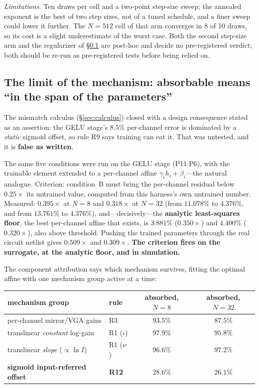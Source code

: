 \documentclass[11pt]{article}
\begin{document}
\textit{Limitations.} Ten draws per cell and a two-point step-size sweep; the annealed exponent is the best of two step sizes, not of a tuned schedule, and a finer sweep could lower it further. The $N=512$ cell of that arm converges in 8 of 10 draws, so its cost is a slight underestimate of the worst case. Both the second step-size arm and the regularizer of \S\ref{sec:gelulimit} are post-hoc and decide no pre-registered verdict; both should be re-run as pre-registered tests before being relied on.

\subsection{The limit of the mechanism: absorbable means ``in the span of the parameters''}
\label{sec:gelulimit}

The mismatch calculus (\S\ref{sec:calculus}) closed with a design consequence stated as an assertion: the GELU stage's $8.5\%$ per-channel error is dominated by a \textit{static} sigmoid offset, so rule R9 says training can eat it. That was untested, and it is \textbf{false as written}.

The same five conditions were run on the GELU stage (P11$\cdot$P6), with the trainable element extended to a per-channel affine $\gamma_i h_i + \beta_i$---the natural analogue. Criterion: condition~B must bring the per-channel residual below $0.25\times$ its untrained value, computed from this harness's own untrained number. Measured: $\mathbf{0.395\times}$ at $N=8$ and $\mathbf{0.318\times}$ at $N=32$ (from $11.078\%$ to $4.376\%$, and from $13.761\%$ to $4.376\%$), and---decisively---the \textbf{analytic least-squares floor}, the best per-channel affine that exists, is $3.881\%$ ($0.350\times$) and $4.400\%$ ($0.320\times$), also above threshold. Pushing the trained parameters through the real circuit netlist gives $0.509\times$ and $0.309\times$. \textbf{The criterion fires on the surrogate, at the analytic floor, and in simulation.}

The component attribution says which mechanism survives, fitting the optimal affine with one mechanism group active at a time:

\begin{center}
\footnotesize
\begin{tabular}{llcc}
\toprule
mechanism group & rule & absorbed, $N=8$ & absorbed, $N=32$ \\
\midrule
per-channel mirror/VGA gains & R3 & $93.5\%$ & $87.5\%$ \\
translinear \textit{constant} log-gain & R1 ($\iota$) & $97.9\%$ & $95.8\%$ \\
translinear \textit{slope} ($\propto \ln I$) & R1 ($\nu$) & $96.6\%$ & $97.2\%$ \\
\textbf{sigmoid input-referred offset} & \textbf{R12} & $\mathbf{28.6\%}$ & $\mathbf{26.1\%}$ \\
\bottomrule
\end{tabular}
\end{center}
\end{document}
